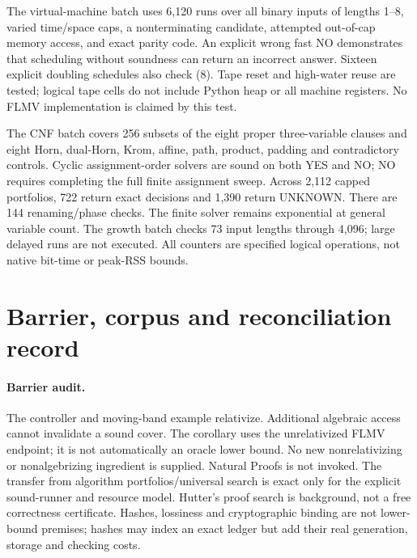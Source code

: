 \documentclass[11pt]{article}
\begin{document}
The virtual-machine batch uses 6,120 runs over all binary inputs of lengths
1--8, varied time/space caps, a nonterminating candidate, attempted out-of-cap
memory access, and exact parity code. An explicit wrong fast NO demonstrates
that scheduling without soundness can return an incorrect answer. Sixteen explicit doubling schedules also check (8). Tape reset
and high-water reuse are tested; logical tape cells do not include Python
heap or all machine registers. No FLMV implementation is claimed by this test.

The CNF batch covers 256 subsets of the eight proper three-variable clauses
and eight Horn, dual-Horn, Krom, affine, path, product, padding and contradictory
controls. Cyclic assignment-order solvers are sound on both YES and NO; NO
requires completing the full finite assignment sweep. Across 2,112 capped
portfolios, 722 return exact decisions and 1,390 return UNKNOWN. There are
144 renaming/phase checks. The finite solver remains exponential at general
variable count. The growth batch checks 73 input lengths through 4,096;
large delayed runs are not executed. All counters are specified logical
operations, not native bit-time or peak-RSS bounds.

\section{Barrier, corpus and reconciliation record}
\paragraph{Barrier audit.}
The controller and moving-band example relativize. Additional algebraic
access cannot invalidate a sound cover. The corollary uses the unrelativized
FLMV endpoint; it is not automatically an oracle lower bound. No new
nonrelativizing or nonalgebrizing ingredient is supplied. Natural Proofs is
not invoked. The transfer from algorithm portfolios/universal search is exact
only for the explicit sound-runner and resource model. Hutter's proof search
is background, not a free correctness certificate. Hashes, lossiness and
cryptographic binding are not lower-bound premises; hashes may index an
exact ledger but add their real generation, storage and checking costs.
\end{document}
